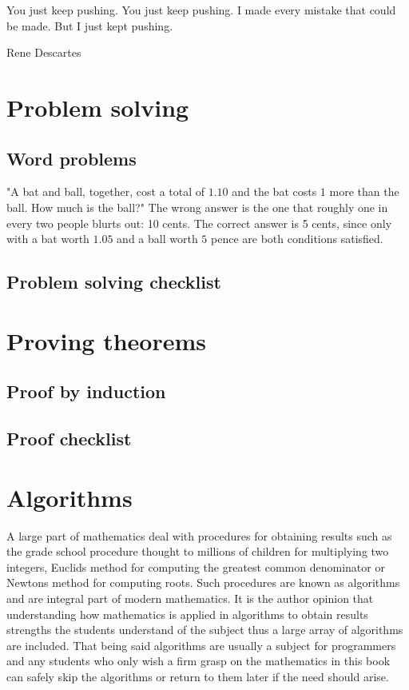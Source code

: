 \epigraph{You just keep pushing. You just keep pushing. I made every mistake that could be made. But I just kept pushing.}{Rene Descartes}

\section{Problem solving}
\subsection{Word problems}
"A bat and ball, together, cost a total of $1.10$ and the bat costs $1$ more than the ball. How much is the ball?" The wrong answer is the one that roughly one in every two people blurts out: 10 cents. The correct answer is 5 cents, since only with a bat worth $1.05$ and a ball worth $5$ pence are both conditions satisfied.

\subsection{Problem solving checklist}

\section{Proving theorems}

\subsection{Proof by induction}
\subsection{Proof checklist}

\section{Algorithms}
A large part of mathematics deal with procedures for obtaining results such as the grade school procedure thought to millions of children for multiplying two integers, Euclids method for computing the greatest common denominator or Newtons method for computing roots. Such procedures are known as algorithms and are integral part of modern mathematics. It is the author opinion that understanding how mathematics is applied in algorithms to obtain results strengths the students understand of the subject thus a large array of algorithms are included. That being said algorithms are usually a subject for programmers and any students who only wish a firm grasp on the mathematics in this book can safely skip the algorithms or return to them later if the need should arise.

